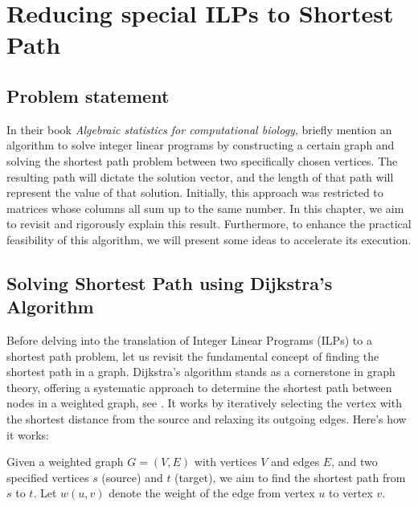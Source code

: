 \chapter{Reducing special ILPs to Shortest Path}
\section{Problem statement}
In their book \textit{Algebraic statistics for computational biology}, \cite{algebraic_statistics} briefly mention an algorithm to solve integer linear programs by constructing a certain graph and solving the shortest path problem between two specifically chosen vertices. The resulting path will dictate the solution vector, and the length of that path will represent the value of that solution. Initially, this approach was restricted to matrices whose columns all sum up to the same number. In this chapter, we aim to revisit and rigorously explain this result. Furthermore, to enhance the practical feasibility of this algorithm, we will present some ideas to accelerate its execution.

\section{Solving Shortest Path using Dijkstra's Algorithm}
Before delving into the translation of Integer Linear Programs (ILPs) to a shortest path problem, let us revisit the fundamental concept of finding the shortest path in a graph. Dijkstra's algorithm stands as a cornerstone in graph theory, offering a systematic approach to determine the shortest path between nodes in a weighted graph, see \cite{introduction_to_algorithms}. It works by iteratively selecting the vertex with the shortest distance from the source and relaxing its outgoing edges. Here's how it works:

Given a weighted graph $G = (V, E)$ with vertices $V$ and edges $E$, and two specified vertices $s$ (source) and $t$ (target), we aim to find the shortest path from $s$ to $t$. Let $w(u, v)$ denote the weight of the edge from vertex $u$ to vertex $v$.


